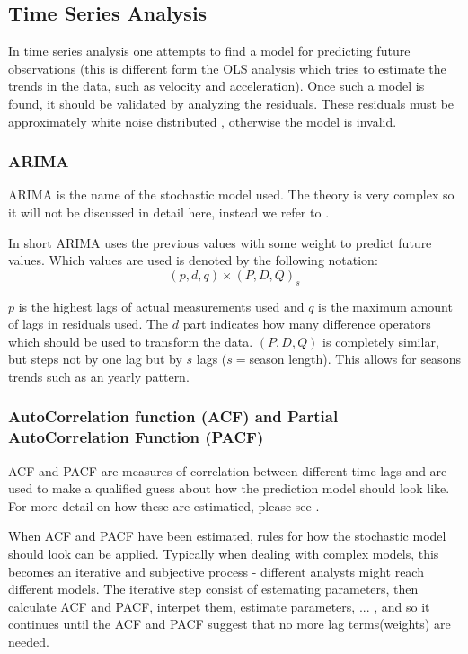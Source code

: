 \subsection{Time Series Analysis}

In time series analysis one attempts to find a model for predicting future observations
(this is different form the OLS analysis which tries to estimate the trends in the data, such as velocity and acceleration).
 Once such a model is found, it should be validated by analyzing the residuals. These residuals must be approximately white noise distributed \cite[p.~130]{time-series-analysis}, otherwise the model is invalid. 

\subsubsection{ARIMA}

ARIMA is the name of the stochastic model used. The theory is very complex so it will not be discussed in detail here, instead we refer to \cite[p.~130]{time-series-analysis}.

In short ARIMA uses the previous values with some weight to predict future values. Which values are used is denoted by the following notation:
\begin{equation}
(p, d, q) \times (P, D, Q)_s
\end{equation}

$p$ is the highest lags of actual measurements used and $q$ is the maximum amount of lags in residuals used. The $d$ part indicates how many difference operators which should be used to transform the data. $(P, D, Q)$ is completely similar, but steps not by one lag but by $s$ lags ($s=$season length). This allows for seasons trends such as an yearly pattern.

\subsubsection{AutoCorrelation function (ACF) and Partial AutoCorrelation Function (PACF)}
 
ACF and PACF are measures of correlation between different time lags and are used to make a qualified guess about how the prediction model should look like. 
For more detail on how these are estimatied, please see \cite[p.~146]{time-series-analysis}.

When ACF and PACF have been estimated, rules \cite[table~6.1]{time-series-analysis} for how the stochastic model should look can be applied.
Typically when dealing with complex models, this becomes an iterative and subjective process - different analysts might reach different models.
The iterative step consist of estemating parameters, then calculate ACF and PACF, interpet them, estimate parameters, ... , and so it continues until the ACF and PACF suggest that no more lag terms(weights) are needed.

